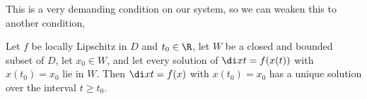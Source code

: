 This is a very demanding condition on our system, so we can weaken this to another condition,

\begin{ndefi}
  Let $f$ be locally Lipschitz in $D$ and $t_0 \in \R$, let $W$ be a closed and bounded subset of $D$, let $x_0 \in W$, and let every solution of $\di x t = f(x(t))$ with $x(t_0) = x_0$ lie in $W$. Then $\di x t = f(x)$ with $x(t_0) = x_0$ has a unique solution over the interval $t \ge t_0$.
\end{ndefi}
